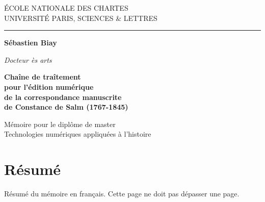 \documentclass[a4paper,12pt,twoside]{book}
\begin{document}
	
	\begin{titlepage}
		\begin{center}
			
			\bigskip
			
			\begin{large}				
				ÉCOLE NATIONALE DES CHARTES\\
				UNIVERSITÉ PARIS, SCIENCES \& LETTRES
			\end{large}
			\begin{center}\rule{2cm}{0.02cm}\end{center}
			
			\bigskip
			\bigskip
			\bigskip
			\begin{Large}
				\textbf{Sébastien Biay}\\
			\end{Large}
			\begin{normalsize} \textit{Docteur ès arts}\\
			\end{normalsize}
			
			\bigskip
			\bigskip
			\bigskip
			
			\begin{Huge}
				\textbf{Chaîne de traîtement \\
					pour l'édition numérique \\
					de la correspondance manuscrite \\
					de Constance de Salm (1767-1845)}\\
			\end{Huge}
			\vfill
			
			\begin{large}
				Mémoire 
				pour le diplôme de master \\
				\og{} Technologies numériques appliquées à l'histoire \fg{} \\
			\end{large}
			
		\end{center}
	\end{titlepage}

	\thispagestyle{empty}	
	\cleardoublepage
	
	\frontmatter
	\chapter*{Résumé}
		\medskip
		Résumé du mémoire en français. Cette page ne doit pas dépasser une page.\\
		
\end{document}
